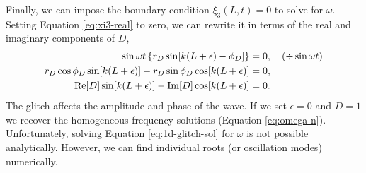 Finally, we can impose the boundary condition \(\xi_3(L, t) = 0\) to solve for \(\omega\). Setting Equation \ref{eq:xi3-real} to zero, we can rewrite it in terms of the real and imaginary components of \(D\),
%
\begin{align}
    \sin \omega t \left\{r_D \sin[k(L + \epsilon) - \phi_D]\right\} &= 0, \quad (\div \sin \omega t) \notag \\
    r_D \cos \phi_D \sin[k(L + \epsilon)] - r_D \sin \phi_D \cos[k(L + \epsilon)] &= 0, \notag \\
    {\mathrm{Re}}[D] \sin[k(L + \epsilon)] - {\mathrm{Im}}[D] \cos[k(L + \epsilon)] &=0. \label{eq:1d-glitch-sol}
\end{align}
%
The glitch affects the amplitude and phase of the wave. If we set \(\epsilon = 0\) and \(D = 1\) we recover the homogeneous frequency solutions (Equation \ref{eq:omega-n}). Unfortunately, solving Equation \ref{eq:1d-glitch-sol} for \(\omega\) is not possible analytically. However, we can find individual roots (or oscillation modes) numerically.

